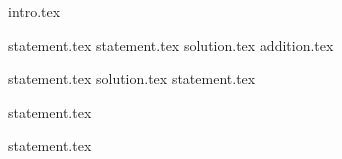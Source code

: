 {intro.tex}

{statement.tex}
{statement.tex}
{solution.tex}
{addition.tex}

{statement.tex}
{solution.tex}
{statement.tex}

{statement.tex}

{statement.tex}